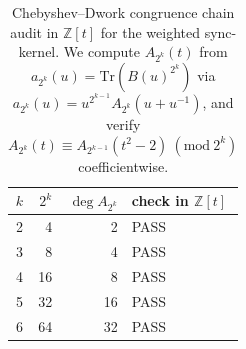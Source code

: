 \begin{table}[H]
\centering
\scriptsize
\setlength{\tabcolsep}{6pt}
\caption{Chebyshev--Dwork congruence chain audit in $\mathbb{Z}[t]$ for the weighted sync-kernel. We compute $A_{2^k}(t)$ from $a_{2^k}(u)=\mathrm{Tr}(B(u)^{2^k})$ via $a_{2^k}(u)=u^{2^{k-1}}A_{2^k}(u+u^{-1})$, and verify $A_{2^k}(t)\equiv A_{2^{k-1}}(t^2-2)\ (\mathrm{mod}\ 2^k)$ coefficientwise.}
\label{tab:sync_kernel_weighted_chebyshev_dwork_chain}
\begin{tabular}{r r r l}
\toprule
$k$ & $2^k$ & $\deg A_{2^k}$ & check in $\mathbb{Z}[t]$\\
\midrule
2 & 4 & 2 & PASS\\
3 & 8 & 4 & PASS\\
4 & 16 & 8 & PASS\\
5 & 32 & 16 & PASS\\
6 & 64 & 32 & PASS\\
\bottomrule
\end{tabular}
\end{table}
